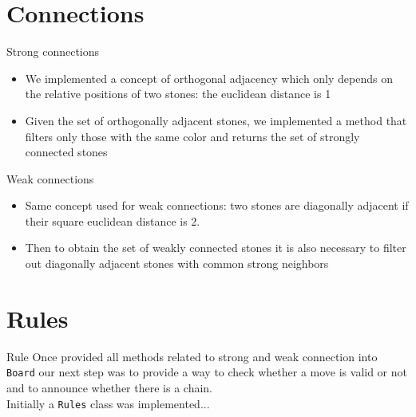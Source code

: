 \documentclass{beamer}
\begin{document}
\section{Connections}

\begin{frame}{Strong connections}
\begin{itemize}
	\item We implemented a concept of orthogonal adjacency which only depends on the relative positions of two stones: the euclidean distance is 1
	\item Given the set of orthogonally adjacent stones, we implemented a method that filters only those with the same color and returns the set of strongly connected stones
\end{itemize}
	
\end{frame}

\begin{frame}{Weak connections}
\begin{itemize}
		\item Same concept used for weak connections: two stones are diagonally adjacent if their square euclidean distance is 2.	
		\item Then to obtain the set of weakly connected stones it is also necessary to filter out diagonally adjacent stones with common strong neighbors
\end{itemize}

	
\end{frame}



\section{Rules}

\begin{frame}{Rule}
	Once provided all methods related to strong and weak connection into \texttt{Board} our next step was to provide a way to check whether a move is valid or not and to announce whether there is a chain.\\
	\vspace{0.7cm} 
	Initially a \texttt{Rules} class was implemented...
	
\end{frame}
\end{document}

